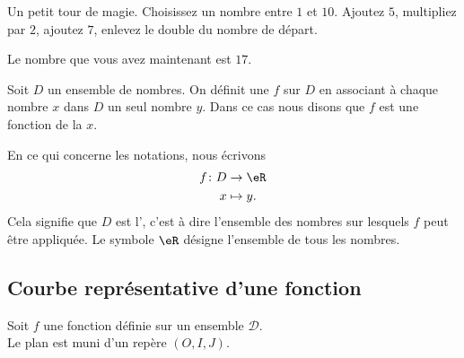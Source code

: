 
\begin{example} \label{ExemVmCkIH}
    Un petit tour de magie. Choisissez un nombre entre \( 1\) et \( 10\). Ajoutez \( 5\), multipliez par \( 2\), ajoutez \( 7\), enlevez le double du nombre de départ.

    Le nombre que vous avez maintenant est \( 17\).
\end{example}

\begin{definition}
    Soit \( D\) un ensemble de nombres. On définit une  \( f\) sur \( D\) en associant à chaque nombre \( x\) dans \( D\) un seul nombre \( y\). Dans ce cas nous disons que \( f\) est une fonction de la  \( x\).
\end{definition}

En ce qui concerne les notations, nous écrivons
\begin{equation}
    \begin{aligned}
        f\colon D&\to \eR \\
        x&\mapsto y. 
    \end{aligned}
\end{equation}
Cela signifie que \( D\) est l', c'est à dire l'ensemble des nombres sur lesquels \( f\) peut être appliquée. Le symbole \( \eR\) désigne l'ensemble de tous les nombres.

\subsection{Courbe représentative d'une fonction}

Soit $f$ une fonction définie sur un ensemble $\mathscr{D}$. \\
Le plan est muni d'un repère $(O,I,J)$.

\begin{definition}
\end{definition}

